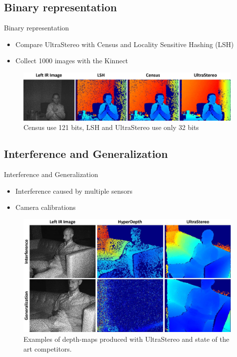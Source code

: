\subsection{Binary representation}
\begin{frame}{Binary representation}
\begin{itemize}
\item Compare UltraStereo with Census and Locality Sensitive Hashing (LSH)
\item Collect 1000 images with the Kinnect
\end{itemize}
\begin{figure}
\includegraphics[scale=0.15]{pictures/fig7}
\caption{Census use 121 bits, LSH and UltraStereo use only 32 bits}
\end{figure}
\end{frame}

\subsection{Interference and Generalization}

\begin{frame}{Interference and Generalization}
\begin{itemize}
\item Interference caused by multiple sensors
\item Camera calibrations
\end{itemize}
\begin{figure}
\includegraphics[scale=0.1]{pictures/fig8}
\caption{Examples of depth-maps produced with UltraStereo and state of the art competitors.}
\end{figure}
\end{frame}

